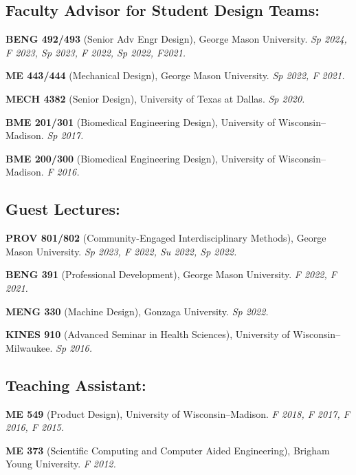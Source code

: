 \documentclass[letterpaper, 10pt]{article}
\begin{document}
\subsection{Faculty Advisor for Student Design Teams:}
\begin{compactitem}
     \item \textbf{BENG 492/493} (Senior Adv Engr Design), George Mason University. \textit{Sp 2024, F 2023, Sp 2023, F 2022, Sp 2022, F2021.}
     \item \textbf{ME 443/444} (Mechanical Design), George Mason University. \textit{Sp 2022, F 2021.}
     \item \textbf{MECH 4382} (Senior Design), University of Texas at Dallas. \textit{Sp 2020.}
     \item \textbf{BME 201/301} (Biomedical Engineering Design), University of Wisconsin--Madison. \textit{Sp 2017.}
     \item \textbf{BME 200/300} (Biomedical Engineering Design), University of Wisconsin--Madison. \textit{F 2016.}
\end{compactitem}

\subsection{Guest Lectures:}
\begin{compactitem}
     \item \textbf{PROV 801/802} (Community-Engaged Interdisciplinary Methods), George Mason University. \textit{Sp 2023, F 2022, Su 2022, Sp 2022.}
     \item \textbf{BENG 391} (Professional Development), George Mason University. \textit{F 2022, F 2021.}
     \item \textbf{MENG 330} (Machine Design), Gonzaga University. \textit{Sp 2022.}
     \item \textbf{KINES 910 }(Advanced Seminar in Health Sciences), University of Wisconsin--Milwaukee. \textit{Sp 2016.}
\end{compactitem}


\subsection{Teaching Assistant:}
\begin{compactitem}
     \item \textbf{ME 549 }(Product Design), University of Wisconsin--Madison. \textit{F 2018, F 2017, F 2016, F 2015.}
     \item \textbf{ME 373 }(Scientific Computing and Computer Aided Engineering), Brigham Young University. \textit{F 2012.}
\end{compactitem}
     
\end{document}
